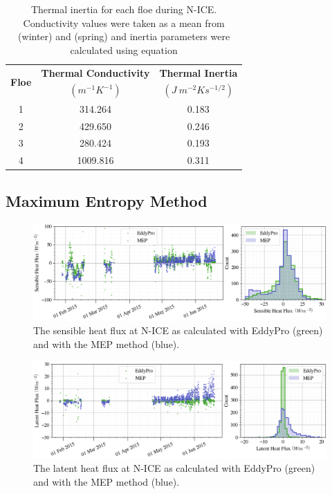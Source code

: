 \begin{table}[H]
\centering
\footnotesize
{
\begin{tabular}{| c | c | c |}
 \hline
\multirow{2}{*}{\textbf{Floe}} & \textbf{Thermal Conductivity} & \textbf{Thermal Inertia}\\
  & $(m^{-1}K^{-1})$ & $(J~m^{-2}Ks^{-1/2})$ \\
  \hline
 1 & 314.264 & 0.183  \\
 2 & 429.650 & 0.246 \\ 
 3 & 280.424 & 0.193 \\
 4 & 1009.816 & 0.311 \\
  \hline
\end{tabular}}
\caption{Thermal inertia for each floe during N-ICE. Conductivity values were taken as a mean from \citep{merkouriadi:2017} (winter) and \citet{merkouriadi:2017} (spring) and inertia parameters were calculated using equation}
\label{tab:thermal}
\end{table}

 \subsection{Maximum Entropy Method}

\begin{figure}[H]
    \centering
    \includegraphics[width=1\linewidth]{figures/chapter5/MEPSensible.png}
    \caption[Sensible heat flux from the MEP method compared to EddyPro]{The sensible heat flux at N-ICE as calculated with EddyPro (green) and with the MEP method (blue).}
    \label{fig:mep:sensible}
\end{figure}

\begin{figure}[H]
    \centering
    \includegraphics[width=1\linewidth]{figures/chapter5/MEPLatent.png}
    \caption[Latent heat flux from the MEP method compared to EddyPro]{The latent heat flux at N-ICE as calculated with EddyPro (green) and with the MEP method (blue).}
    \label{fig:mep:latent}
\end{figure}

